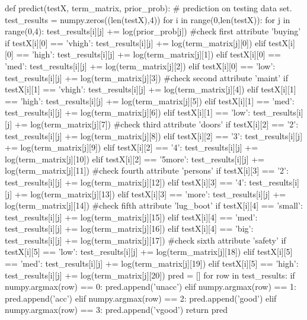 \begin{mycode}
def predict(testX, term_matrix, prior_prob):
	# prediction on testing data set.
    test_results = numpy.zeros((len(testX),4))
    for i in range(0,len(testX)):
        for j in range(0,4):
            test_results[i][j] += log(prior_prob[j])
            #check first attribute 'buying'
            if testX[i][0] == 'vhigh':
                test_results[i][j] += log(term_matrix[j][0])
            elif testX[i][0] == 'high':
                test_results[i][j] += log(term_matrix[j][1])
            elif testX[i][0] == 'med':
                test_results[i][j] += log(term_matrix[j][2])
            elif testX[i][0] == 'low':
                test_results[i][j] += log(term_matrix[j][3])
            #check second attribute 'maint'
            if testX[i][1] == 'vhigh':
                test_results[i][j] += log(term_matrix[j][4])
            elif testX[i][1] == 'high':
                test_results[i][j] += log(term_matrix[j][5])
            elif testX[i][1] == 'med':
                test_results[i][j] += log(term_matrix[j][6])
            elif testX[i][1] == 'low':
                test_results[i][j] += log(term_matrix[j][7])
            #check third attribute 'doors'
            if testX[i][2] == '2':
                test_results[i][j] += log(term_matrix[j][8])
            elif testX[i][2] == '3':
                test_results[i][j] += log(term_matrix[j][9])
            elif testX[i][2] == '4':
                test_results[i][j] += log(term_matrix[j][10])
            elif testX[i][2] == '5more':
                test_results[i][j] += log(term_matrix[j][11])
            #check fourth attribute 'persons'
            if testX[i][3] == '2':
                test_results[i][j] += log(term_matrix[j][12])
            elif testX[i][3] == '4':
                test_results[i][j] += log(term_matrix[j][13])
            elif testX[i][3] == 'more':
                test_results[i][j] += log(term_matrix[j][14])
            #check fifth attribute 'lug_boot'
            if testX[i][4] == 'small':
                test_results[i][j] += log(term_matrix[j][15])
            elif testX[i][4] == 'med':
                test_results[i][j] += log(term_matrix[j][16])
            elif testX[i][4] == 'big':
                test_results[i][j] += log(term_matrix[j][17])
            #check sixth attribute 'safety'
            if testX[i][5] == 'low':
                test_results[i][j] += log(term_matrix[j][18])
            elif testX[i][5] == 'med':
                test_results[i][j] += log(term_matrix[j][19])
            elif testX[i][5] == 'high':
                test_results[i][j] += log(term_matrix[j][20])
    pred = []
    for row in test_results:
        if numpy.argmax(row) == 0:
            pred.append('unacc')
        elif numpy.argmax(row) == 1:
            pred.append('acc')
        elif numpy.argmax(row) == 2:
            pred.append('good')
        elif numpy.argmax(row) == 3:
            pred.append('vgood')    
    return pred
\end{mycode}

